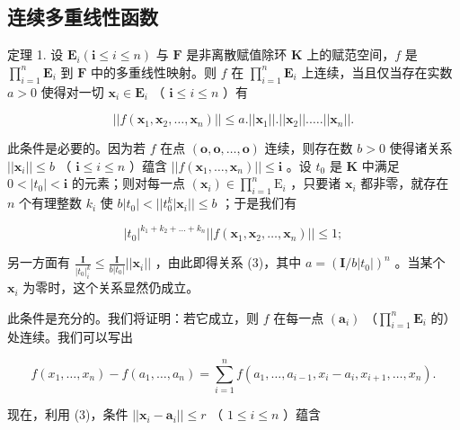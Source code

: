 \subsection{连续多重线性函数}

定理 1. 设 \(\mathbf{E}_i(\mathbf{i} \leqslant i \leqslant n)\) 与 \(\mathbf{F}\) 是非离散赋值除环 \(\mathbf{K}\) 上的赋范空间，\(f\) 是 \(\prod_{i=1}^{n} \mathbf{E}_i\) 到 \(\mathbf{F}\) 中的多重线性映射。则 \(f\) 在 \(\prod_{i=1}^{n} \mathbf{E}_i\) 上连续，当且仅当存在实数 \(a > 0\) 使得对一切 \(\boldsymbol{x}_i \in \mathbf{E}_i\) （ \(\mathbf{i} \leqslant i \leqslant n\) ）有

\[
\left| \left| f \left(\boldsymbol {x} _ {1}, \boldsymbol {x} _ {2}, \dots , \boldsymbol {x} _ {n}\right) \right| \right| \leqslant a. \left| \left| \boldsymbol {x} _ {1} \right| \right|. \left| \left| \boldsymbol {x} _ {2} \right| \right|. \dots . \left| \left| \boldsymbol {x} _ {n} \right| \right|.\tag{3}
\]

此条件是必要的。因为若 \(f\) 在点 \((\mathbf{o}, \mathbf{o}, \ldots, \mathbf{o})\) 连续，则存在数 \(b > 0\) 使得诸关系 \(||\boldsymbol{x}_i|| \leqslant b\) （ \(\mathbf{i} \leqslant i \leqslant n\) ）蕴含 \(||f(\boldsymbol{x}_1, \ldots, \boldsymbol{x}_n)|| \leqslant \mathbf{i}\) 。设 \(t_0\) 是 \(\mathbf{K}\) 中满足 \(0 < |t_0| < \mathbf{i}\) 的元素；则对每一点 \((\boldsymbol{x}_i) \in \prod_{i=1}^{n} \mathrm{E}_i\) ，只要诸 \(\boldsymbol{x}_i\) 都非零，就存在 \(n\) 个有理整数 \(k_i\) 使 \(b|t_0| < ||t_0^k |\boldsymbol{x}_i|| \leqslant b\) ；于是我们有

\[
\left| t _ {0} \right| ^ {k _ {1} + k _ {2} + \dots + k _ {n}} \left| \left| f \left(\boldsymbol {x} _ {1}, \boldsymbol {x} _ {2}, \dots , \boldsymbol {x} _ {n}\right) \right| \right| \leqslant 1;
\]

另一方面有 \(\frac{\mathbf{I}}{|t_0|^k_i} \leqslant \frac{\mathbf{I}}{b|t_0|} ||\boldsymbol{x}_i||\) ，由此即得关系 (3)，其中 \(a = (\mathbf{I}/b|t_0|)^n\) 。当某个 \(\boldsymbol{x}_i\) 为零时，这个关系显然仍成立。

此条件是充分的。我们将证明：若它成立，则 \(f\) 在每一点 \((\pmb{a}_i)\) （\(\prod_{i=1}^{n} \mathbf{E}_i\) 的）处连续。我们可以写出

\[
f \left(x _ {1}, \dots , x _ {n}\right) - f \left(a _ {1}, \dots , a _ {n}\right) = \sum_ {i = 1} ^ {n} f \left(a _ {1}, \dots , a _ {i - 1}, x _ {i} - a _ {i}, x _ {i + 1}, \dots , x _ {n}\right).
\]

现在，利用 (3)，条件 \(||\pmb{x}_i - \pmb{a}_i|| \leqslant r\) （ \(1 \leqslant i \leqslant n\) ）蕴含

